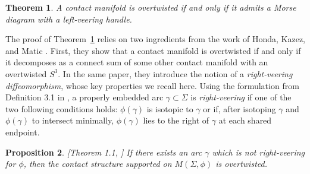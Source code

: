 \documentclass{amsart}
\newtheorem{theorem}{Theorem}[section]
\newtheorem{proposition}[theorem]{Proposition}
\theoremstyle{definition}
\begin{document}
\begin{theorem}\label{thm:OT}
A contact manifold is overtwisted if and only if it admits a Morse diagram with a left-veering handle.
\end{theorem} 

The proof of Theorem~\ref{thm:OT} relies on two ingredients from the work of Honda, Kazez, and Matic \cite{HKM}.  First,  they show that a contact manifold is overtwisted if and only if it decomposes as a connect sum of some other contact manifold with an overtwisted $S^3$.  In the same paper, they introduce the notion of a \textit{right-veering diffeomorphism}, whose key properties we recall here.   Using the formulation from  Definition 3.1 in  \cite{IK},  a properly embedded arc $\gamma\subset \Sigma$ is \textit{right-veering} if one of the two following conditions holds: $\phi(\gamma)$ is isotopic to $\gamma$ or if, after isotoping $\gamma$ and $\phi(\gamma)$ to intersect minimally, $\phi(\gamma)$ lies to the right of $\gamma$ at each shared endpoint.

\begin{proposition}\label{prop:hkm}[Theorem 1.1, \cite{HKM}] If there exists an arc $\gamma$ which is not right-veering for $\phi$, then the contact structure supported on $M(\Sigma, \phi)$ is overtwisted.
\end{proposition}
\end{document}

